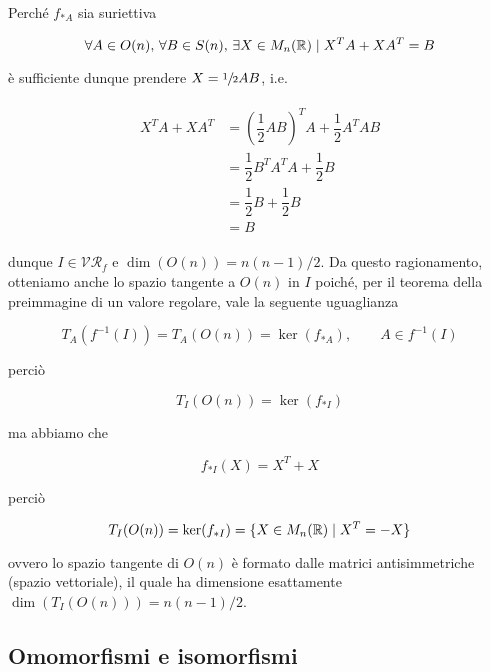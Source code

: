 Perché $ f_{*A} $ sia suriettiva

\begin{equation}
	\forall A \in O(n), \, \forall B \in S(n), \, \exists X \in M_{n}(\mathbb{R}) \mid X^{T} A + X A^{T} = B
\end{equation}

è sufficiente dunque prendere $ X = \sfrac{1}{2} AB $, i.e.

\begin{align}
	\begin{split}
		X^{T} A + X A^{T} &= \left( \dfrac{1}{2} A B \right)^{T} A + \dfrac{1}{2} A^{T} A B\\
		&= \dfrac{1}{2} B^{T} A^{T} A + \dfrac{1}{2} B\\
		&= \dfrac{1}{2} B + \dfrac{1}{2} B\\
		&= B
	\end{split}
\end{align}

dunque $ I \in \mathcal{VR}_{f} $ e $ \dim(O(n)) = n(n-1)/2 $. Da questo ragionamento, otteniamo anche lo spazio tangente a $ O(n) $ in $ I $ poiché, per il teorema della preimmagine di un valore regolare, vale la seguente uguaglianza

\begin{equation}
	T_{A}(f^{-1}(I)) = T_{A}(O(n)) = \ker(f_{*A}), \qquad A \in f^{-1}(I)
\end{equation}

perciò

\begin{equation}
	T_{I}(O(n)) = \ker(f_{*I})
\end{equation}

ma abbiamo che

\begin{equation}
	f_{*I}(X) = X^{T} + X
\end{equation}

perciò

\begin{equation}
	T_{I}(O(n)) = \ker(f_{*I}) = \{ X \in M_{n}(\mathbb{R}) \mid X^{T} = -X \}
\end{equation}

ovvero lo spazio tangente di $ O(n) $ è formato dalle matrici antisimmetriche (spazio vettoriale), il quale ha dimensione esattamente $ \dim(T_{I}(O(n))) = n(n-1)/2 $.

\subsection{Omomorfismi e isomorfismi}

